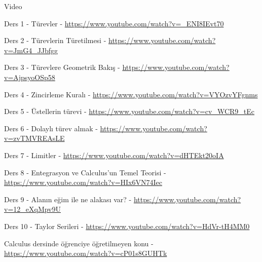 \documentclass[12pt,fleqn]{article}\usepackage{../../common}
\begin{document}
Video

Ders 1 - Türevler - \url{https://www.youtube.com/watch?v=_ENI8IEvt70}

Ders 2 - Türevlerin Türetilmesi - \url{https://www.youtube.com/watch?v=JmG4_JJbfgg}

Ders 3 - Türevlere Geometrik Bakış - \url{https://www.youtube.com/watch?v=AjpsyoOSp58}

Ders 4 - Zincirleme Kuralı - \url{https://www.youtube.com/watch?v=VYOzvYFgnms}

Ders 5 - Üstellerin türevi - \url{https://www.youtube.com/watch?v=cv_WCR9_tEc}

Ders 6 - Dolaylı türev almak - \url{https://www.youtube.com/watch?v=zvTMVREAsLE}

Ders 7 - Limitler - \url{https://www.youtube.com/watch?v=dHTEkt20oIA}

Ders 8 -  Entegrasyon ve Calculus'un Temel Teorisi - \url{https://www.youtube.com/watch?v=HIx6VN74Iec}

Ders 9 - Alanın eğim ile ne alakası var? - \url{https://www.youtube.com/watch?v=12_eXqMpv9U}

Ders 10 - Taylor Serileri - \url{https://www.youtube.com/watch?v=HdVr-tH4MM0}

Calculus dersinde öğrenciye öğretilmeyen konu - \url{https://www.youtube.com/watch?v=cP01s8GUHTk}
\end{document}
